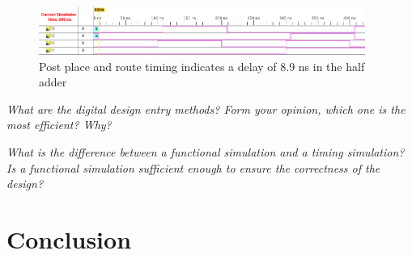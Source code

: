 \documentclass[11pt]{article}
\begin{document}
\begin{figure}[htbp]
	\centering
	\includegraphics[width=0.95\textwidth, draft=false]{post_place_timing}
	\caption{Post place and route timing indicates a delay of 8.9 ns in the half adder}
	\label{fig:timing}
\end{figure}



{\em What are the digital design entry methods? Form your opinion, which one
is the most efficient? Why?}

{\em What is the difference between a functional simulation and a timing
simulation? Is a functional simulation sufficient enough to ensure the correctness of the design?}

\section{Conclusion}
\end{document}
